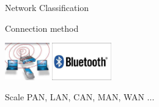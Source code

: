 \begin{frame}{Network Classification}
\begin{iblock}{Connection method}
\begin{center}
{      \includegraphics[height=1.6cm]{wlan}\quad
      \includegraphics[height=1.6cm]{bluz}}
    \end{center}
  \end{iblock}
\end{frame}

\begin{frame}
  \begin{iblock}{Scale}
      \small{PAN}, \large{LAN}, \Large{CAN}, \LARGE{MAN}, \Huge{WAN} ...
  \end{iblock}
\end{frame}

